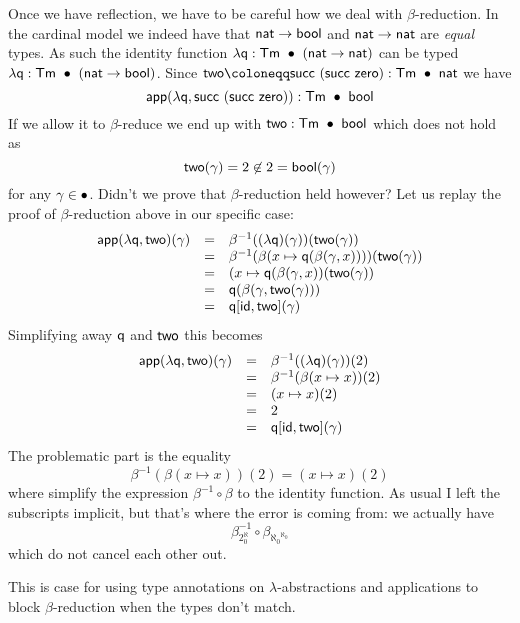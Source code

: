 Once we have reflection, we have to be careful how we deal with
\(\beta\)-reduction. In the cardinal model we indeed have that
\(\mathsf{nat} \to \mathsf{bool}\) and \(\mathsf{nat} \to \mathsf{nat}\) are \emph{equal} types.
As such the identity function \(\lambda \mathsf{q} : \mathsf{Tm}\ \bullet\ (\mathsf{nat} \to \mathsf{nat})\)
can be typed \(\lambda \mathsf{q} : \mathsf{Tm}\ \bullet\ (\mathsf{nat} \to \mathsf{bool})\).
Since \(\ctwo \coloneqq \csucc\ (\csucc\ \czero) : \CTm\ \ctxempty\ \nat\)
we have
\[
  \mathsf{app}(\lambda \mathsf{q}, \mathsf{succ}\ (\mathsf{succ}\ \mathsf{zero})) : \mathsf{Tm}\ \bullet\ \mathsf{bool}
\]
If we allow it to \(\beta\)-reduce we end up with
\(\ctwo : \CTm\ \ctxempty\ \bool\) which does not hold as
\[
  \mathsf{two}(\gamma) = 2 \not\in 2 = \mathsf{bool}(\gamma)
\]
for any \(\gamma \in \bullet\).
Didn't we prove that \(\beta\)-reduction held however?
Let us replay the proof of \(\beta\)-reduction above in our specific case:
\[
  \begin{array}{rcl}
    \mathsf{app}(\lambda \mathsf{q}, \mathsf{two})(\gamma)
    &=& \beta^{-1}((\lambda \mathsf{q})(\gamma))(\mathsf{two}(\gamma)) \\
    &=& \beta^{-1}(\beta(x \mapsto \mathsf{q}(\beta(\gamma,x))))(\mathsf{two}(\gamma)) \\
    &=& (x \mapsto \mathsf{q}(\beta(\gamma,x))(\mathsf{two}(\gamma)) \\
    &=& \mathsf{q}(\beta(\gamma, \mathsf{two}(\gamma))) \\
    &=& \mathsf{q}[\mathsf{id}, \mathsf{two}](\gamma)
  \end{array}
\]
Simplifying away \(\mathsf{q}\) and \(\mathsf{two}\) this becomes
\[
  \begin{array}{rcl}
    \mathsf{app}(\lambda \mathsf{q}, \mathsf{two})(\gamma)
    &=& \beta^{-1}((\lambda \mathsf{q})(\gamma))(2) \\
    &=& \beta^{-1}(\beta(x \mapsto x))(2) \\
    &=& (x \mapsto x)(2) \\
    &=& 2 \\
    &=& \mathsf{q}[\mathsf{id}, \mathsf{two}](\gamma)
  \end{array}
\]
The problematic part is the equality
\[
  \beta^{-1}(\beta(x \mapsto x))(2) = (x \mapsto x)(2)
\]
where simplify the expression \(\beta^{-1} \circ \beta\) to the identity
function. As usual I left the subscripts implicit, but that's where the error
is coming from: we actually have
\[
  \beta_{2^\aleph_0}^{-1} \circ \beta_{{\aleph_0}^{\aleph_0}}
\]
which do not cancel each other out.

This is case for using type annotations on \(\lambda\)-abstractions and
applications to block \(\beta\)-reduction when the types don't match.

